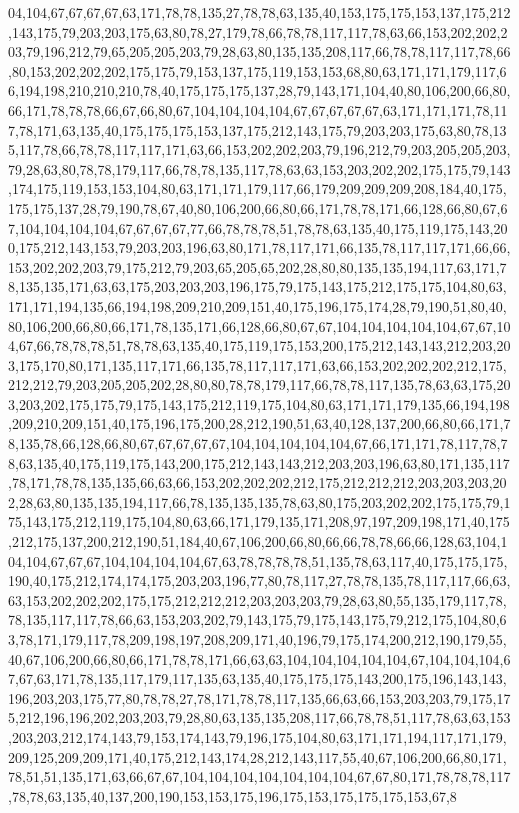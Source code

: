 04,104,67,67,67,67,63,171,78,78,135,27,78,78,63,135,40,153,175,175,153,137,175,212,143,175,79,203,203,175,63,80,78,27,179,78,66,78,78,117,117,78,63,66,153,202,202,203,79,196,212,79,65,205,205,203,79,28,63,80,135,135,208,117,66,78,78,117,117,78,66,80,153,202,202,202,175,175,79,153,137,175,119,153,153,68,80,63,171,171,179,117,66,194,198,210,210,210,78,40,175,175,175,137,28,79,143,171,104,40,80,106,200,66,80,66,171,78,78,78,66,67,66,80,67,104,104,104,104,67,67,67,67,67,63,171,171,171,78,117,78,171,63,135,40,175,175,175,153,137,175,212,143,175,79,203,203,175,63,80,78,135,117,78,66,78,78,117,117,171,63,66,153,202,202,203,79,196,212,79,203,205,205,203,79,28,63,80,78,78,179,117,66,78,78,135,117,78,63,63,153,203,202,202,175,175,79,143,174,175,119,153,153,104,80,63,171,171,179,117,66,179,209,209,209,208,184,40,175,175,175,137,28,79,190,78,67,40,80,106,200,66,80,66,171,78,78,171,66,128,66,80,67,67,104,104,104,104,67,67,67,67,77,66,78,78,78,51,78,78,63,135,40,175,119,175,143,200,175,212,143,153,79,203,203,196,63,80,171,78,117,171,66,135,78,117,117,171,66,66,153,202,202,203,79,175,212,79,203,65,205,65,202,28,80,80,135,135,194,117,63,171,78,135,135,171,63,63,175,203,203,203,196,175,79,175,143,175,212,175,175,104,80,63,171,171,194,135,66,194,198,209,210,209,151,40,175,196,175,174,28,79,190,51,80,40,80,106,200,66,80,66,171,78,135,171,66,128,66,80,67,67,104,104,104,104,104,67,67,104,67,66,78,78,78,51,78,78,63,135,40,175,119,175,153,200,175,212,143,143,212,203,203,175,170,80,171,135,117,171,66,135,78,117,117,171,63,66,153,202,202,202,212,175,212,212,79,203,205,205,202,28,80,80,78,78,179,117,66,78,78,117,135,78,63,63,175,203,203,202,175,175,79,175,143,175,212,119,175,104,80,63,171,171,179,135,66,194,198,209,210,209,151,40,175,196,175,200,28,212,190,51,63,40,128,137,200,66,80,66,171,78,135,78,66,128,66,80,67,67,67,67,67,104,104,104,104,104,67,66,171,171,78,117,78,78,63,135,40,175,119,175,143,200,175,212,143,143,212,203,203,196,63,80,171,135,117,78,171,78,78,135,135,66,63,66,153,202,202,202,212,175,212,212,212,203,203,203,202,28,63,80,135,135,194,117,66,78,135,135,135,78,63,80,175,203,202,202,175,175,79,175,143,175,212,119,175,104,80,63,66,171,179,135,171,208,97,197,209,198,171,40,175,212,175,137,200,212,190,51,184,40,67,106,200,66,80,66,66,78,78,66,66,128,63,104,104,104,67,67,67,104,104,104,104,67,63,78,78,78,78,51,135,78,63,117,40,175,175,175,190,40,175,212,174,174,175,203,203,196,77,80,78,117,27,78,78,135,78,117,117,66,63,63,153,202,202,202,175,175,212,212,212,203,203,203,79,28,63,80,55,135,179,117,78,78,135,117,117,78,66,63,153,203,202,79,143,175,79,175,143,175,79,212,175,104,80,63,78,171,179,117,78,209,198,197,208,209,171,40,196,79,175,174,200,212,190,179,55,40,67,106,200,66,80,66,171,78,78,171,66,63,63,104,104,104,104,104,67,104,104,104,67,67,63,171,78,135,117,179,117,135,63,135,40,175,175,175,143,200,175,196,143,143,196,203,203,175,77,80,78,78,27,78,171,78,78,117,135,66,63,66,153,203,203,79,175,175,212,196,196,202,203,203,79,28,80,63,135,135,208,117,66,78,78,51,117,78,63,63,153,203,203,212,174,143,79,153,174,143,79,196,175,104,80,63,171,171,194,117,171,179,209,125,209,209,171,40,175,212,143,174,28,212,143,117,55,40,67,106,200,66,80,171,78,51,51,135,171,63,66,67,67,104,104,104,104,104,104,104,67,67,80,171,78,78,78,117,78,78,63,135,40,137,200,190,153,153,175,196,175,153,175,175,175,153,67,8